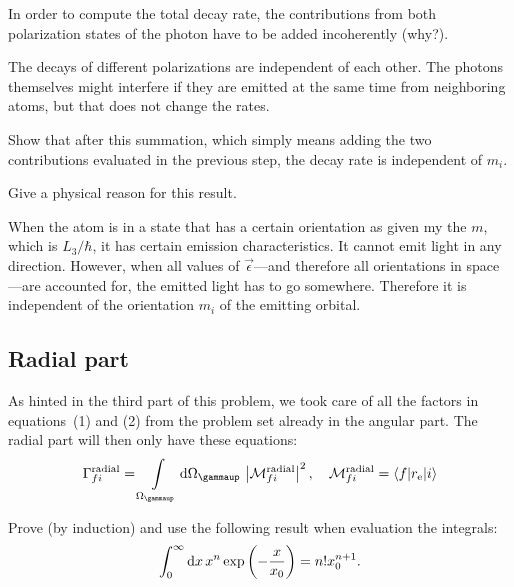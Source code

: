 \documentclass[11pt, english, fleqn, DIV=15, headinclude, BCOR=1.5cm]{scrartcl}
\newcommand\ra{^\text{radial}}
\begin{document}
\begin{problem}
    In order to compute the total decay rate, the contributions from both
    polarization states of the photon have to be added incoherently (why?).
\end{problem}

The decays of different polarizations are independent of each other. The
photons themselves might interfere if they are emitted at the same time from
neighboring atoms, but that does not change the rates.

\begin{problem}
    Show that after this summation, which simply means adding the two
    contributions evaluated in the previous step, the decay rate is independent
    of $m_i$.
\end{problem}

\begin{problem}
    Give a physical reason for this result.
\end{problem}

When the atom is in a state that has a certain orientation as given my the $m$,
which is $L_3 / \hbar$, it has certain emission characteristics. It cannot emit
light in any direction. However, when all values of $\vec \epsilon$---and
therefore all orientations in space---are accounted for, the emitted light has
to go somewhere. Therefore it is independent of the orientation $m_i$ of the
emitting orbital.

\subsection{Radial part}

As hinted in the third part of this problem, we took care of all the factors in
equations~(1) and (2) from the problem set already in the angular part. The
radial part will then only have these equations:
\[
    \Gamma_{fi}\ra = \intop_{\Omega_\gammaup} \dif \Omega_\gammaup \,
    \abs{\mathcal M_{fi}\ra}^2
    \eqnsep
    \mathcal M_{fi}\ra = \braket{f|r_\text e|i}
\]

\begin{problem}
    Prove (by induction) and use the following result when evaluation the
    integrals:
    \[
        \int_0^\infty \mathop{}\!\mathrm d x \, x^n \exp\left( - \frac{x}{x_0} \right) = n! x_0^{n+1}.
    \]
\end{problem}
\end{document}
